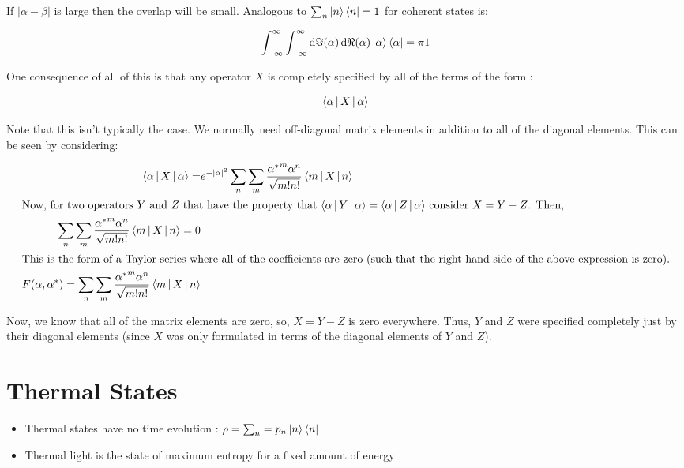 \documentclass{article}
\begin{document}
If $\left| \alpha - \beta \right| $ is large then the overlap will be small.
Analogous to $ \sum_n \ket{n} \bra{n} = 1 $ for coherent states is:

\[
   \int_{-\infty}^\infty \int_{-\infty}^\infty \dif \Im{(\alpha)} \dif
   \Re{(\alpha)} \Ket{\alpha}\Bra{\alpha} = \pi 1
\]

One consequence of all of this is that any operator $ X $ is completely
specified by all of the terms of the form :

\[
   \Braket{\alpha | X | \alpha}
\]

Note that this isn't typically the case. We normally need off-diagonal matrix
elements in addition to all of the diagonal elements. This can be seen by
considering:

\begin{align*}
   \Braket{\alpha | X | \alpha} =& e^{- \left| \alpha \right|^2} \sum_n \sum_m
   \frac{{\alpha^*}^m {\alpha^n}}{\sqrt{m!n!}} \Braket{m | X | n}  \\
   \intertext{Now, for two operators $ Y $ and $ Z $ that have the property that
   $ \Braket{\alpha | Y | \alpha } = \Braket{\alpha | Z | \alpha} $ consider $ X
   = Y - Z $.  Then, }
   \sum_n \sum_m \frac{{\alpha^*}^m \alpha^n}{\sqrt{m!n!}} \Braket{m | X | n} =
   0 \\
   \intertext{This is the form of a Taylor series where all of the coefficients
   are zero (such that the right hand side of the above expression is zero).}
   F(\alpha,\alpha^*) = \sum_n \sum_m \frac{{\alpha^*}^m \alpha^n}{\sqrt{m!n!}}
   \Braket{m | X | n}
\end{align*}

Now, we know that all of the matrix elements are zero, so, $X = Y-Z$ is zero
everywhere. Thus, $Y$ and $Z$ were specified completely just by their diagonal
elements (since $X$ was only formulated in terms of the diagonal elements of $Y$
and $Z$).

\section{Thermal States}
\label{sec:thermal_states}

\begin{itemize}
   \item Thermal states have no time evolution : $ \rho = \sum_n = p_n
      \Ket{n}\Bra{n} $ 
   \item Thermal light is the state of maximum entropy for a fixed amount of
      energy
\end{itemize}
\end{document}
